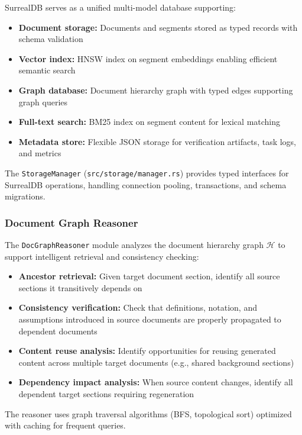 \documentclass{ieeeaccess}
\begin{document}
SurrealDB serves as a unified multi-model database supporting:

\begin{itemize}
\item \textbf{Document storage:} Documents and segments stored as typed records with schema validation
\item \textbf{Vector index:} HNSW index on segment embeddings enabling efficient semantic search
\item \textbf{Graph database:} Document hierarchy graph with typed edges supporting graph queries
\item \textbf{Full-text search:} BM25 index on segment content for lexical matching
\item \textbf{Metadata store:} Flexible JSON storage for verification artifacts, task logs, and metrics
\end{itemize}

The \texttt{StorageManager} (\texttt{src/storage/manager.rs}) provides typed interfaces for SurrealDB operations, handling connection pooling, transactions, and schema migrations.

\subsubsection{Document Graph Reasoner}

The \texttt{DocGraphReasoner} module analyzes the document hierarchy graph \(\mathcal{H}\) to support intelligent retrieval and consistency checking:

\begin{itemize}
\item \textbf{Ancestor retrieval:} Given target document section, identify all source sections it transitively depends on
\item \textbf{Consistency verification:} Check that definitions, notation, and assumptions introduced in source documents are properly propagated to dependent documents
\item \textbf{Content reuse analysis:} Identify opportunities for reusing generated content across multiple target documents (e.g., shared background sections)
\item \textbf{Dependency impact analysis:} When source content changes, identify all dependent target sections requiring regeneration
\end{itemize}

The reasoner uses graph traversal algorithms (BFS, topological sort) optimized with caching for frequent queries.
\end{document}
